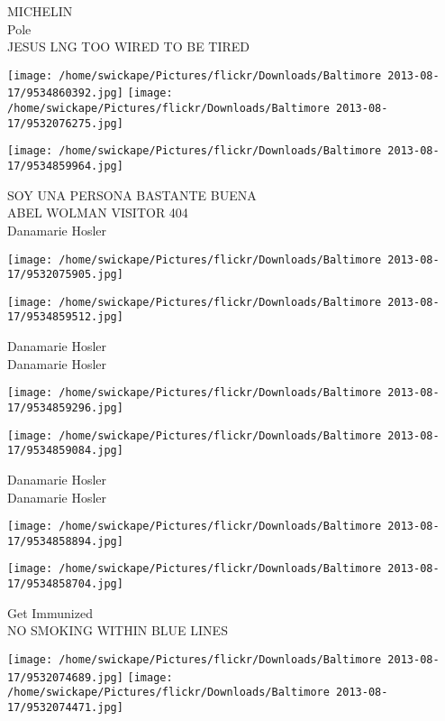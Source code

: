 \documentclass[10pt,letterpaper]{article}
\begin{document}
MICHELIN\\
Pole\\
JESUS LNG TOO WIRED TO BE TIRED
\pagebreak

\texttt{[image: /home/swickape/Pictures/flickr/Downloads/Baltimore 2013-08-17/9534860392.jpg]}
\texttt{[image: /home/swickape/Pictures/flickr/Downloads/Baltimore 2013-08-17/9532076275.jpg]}

\vspace{0.25in}
\texttt{[image: /home/swickape/Pictures/flickr/Downloads/Baltimore 2013-08-17/9534859964.jpg]}

SOY UNA PERSONA BASTANTE BUENA\\
ABEL WOLMAN VISITOR 404\\
Danamarie Hosler
\pagebreak

\texttt{[image: /home/swickape/Pictures/flickr/Downloads/Baltimore 2013-08-17/9532075905.jpg]}

\vspace{0.25in}
\texttt{[image: /home/swickape/Pictures/flickr/Downloads/Baltimore 2013-08-17/9534859512.jpg]}

Danamarie Hosler\\
Danamarie Hosler
\pagebreak

\texttt{[image: /home/swickape/Pictures/flickr/Downloads/Baltimore 2013-08-17/9534859296.jpg]}

\vspace{0.25in}
\texttt{[image: /home/swickape/Pictures/flickr/Downloads/Baltimore 2013-08-17/9534859084.jpg]}

Danamarie Hosler\\
Danamarie Hosler
\pagebreak

\texttt{[image: /home/swickape/Pictures/flickr/Downloads/Baltimore 2013-08-17/9534858894.jpg]}

\vspace{0.25in}
\texttt{[image: /home/swickape/Pictures/flickr/Downloads/Baltimore 2013-08-17/9534858704.jpg]}

Get Immunized\\
NO SMOKING WITHIN BLUE LINES
\pagebreak

\texttt{[image: /home/swickape/Pictures/flickr/Downloads/Baltimore 2013-08-17/9532074689.jpg]}
\texttt{[image: /home/swickape/Pictures/flickr/Downloads/Baltimore 2013-08-17/9532074471.jpg]}
\end{document}

